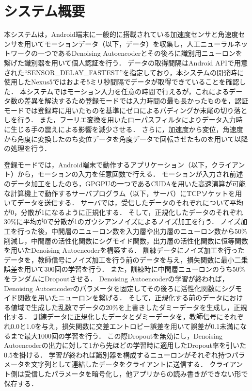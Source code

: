 \section{システム概要}
本システムは，Android端末に一般的に搭載されている加速度センサと角速度センサを用いてモーションデータ（以下，データ）を収集し，人工ニューラルネットワークの一つであるDenoising Autoencoderとその後ろに識別用ニューロンを繋げた識別器を用いて個人認証を行う．
データの取得間隔はAndroid APIで用意された``SENSOR\_DELAY\_FASTEST''を指定しており，本システムの開発時に使用したNexus5ではおよそ5ミリ秒間隔でデータが取得できていることを確認した．
本システムではモーション入力を任意の時間で行えるが，これによるデータ数の差異を解決するため登録モードでは入力時間の最も長かったものを，認証モードでは登録時に用いたものを基準にゼロによるパディングか末尾の切り落としを行う．
また，フーリエ変換を用いたローパスフィルタによりデータ入力時に生じる手の震えによる影響を減少させる．
さらに，加速度から変位，角速度から角度に変換したのち変位データを角度データで回転させたものを用いて以降の処理を行う．

登録モードでは，Android端末で動作するアプリケーション（以下，クライアント）から，モーションの入力を任意回数で行える．
モーションが入力され前述のデータ加工をしたのち，GPGPUの一つであるCUDAを用いた高速演算が可能な計算機上で動作するサーバプログラム（以下，サーバ）にTCPソケットを用いてデータを送信する．
サーバでは，受信したデータのそれぞれについて平均が0，分散が1になるように正規化する．
そして，正規化したデータのそれぞれ30\%に平均が0で分散が1のガウシアンノイズによるノイズ加工を行う．
ノイズ加工を行った後，中間層のニューロン数を入力層や出力層のニューロン数から50\%削減し，中間層の活性化関数にシグモイド関数，出力層の活性化関数に恒等関数を用いたDenoising Autoencoderを構築する．
訓練データにノイズ加工を行ったデータを，教師信号にノイズ加工を行う前のデータを与え，損失関数に最小二乗誤差を用いて300回の学習を行う．
また，訓練時に中間層ニューロンのうち50\%をランダムにDropoutさせる．
Denoising Autoencoderの学習が終われば，Denoising Autoencoderのパラメータを固定してその後ろに活性化関数にシグモイド関数を用いたニューロンを繋げる．
そして，正規化する前のデータにおける値域で生成した乱数でデータの20\%を上書きしたダミーデータを生成し，正規化する．
訓練データに正規化したデータとダミーデータを，教師信号にそれぞれ0.0と1.0を与え，損失関数に交差エントロピー誤差を用いて誤差が0.1未満になるまで最大1000回の学習を行う．
この際Dropoutを無効にし，Denoising Autoencoderの出力に対して1から先ほどの学習時に適用したDropout率を引いた0.5を掛ける．
学習が終われば識別器を構成するニューロンがそれぞれ持つパラメータを文字列として連結したデータをクライアントに送信する．
クライアント側は受信したパラメータを暗号化し，他アプリからの読み書きができない形で保存する．

